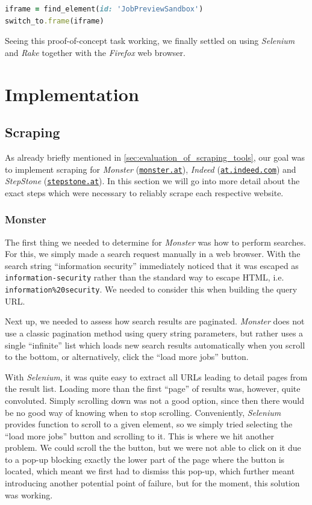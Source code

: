 \documentclass[runningheads]{llncs}
\begin{document}
\begin{lstlisting}[language=Ruby]
iframe = find_element(id: 'JobPreviewSandbox')
switch_to.frame(iframe)
\end{lstlisting}

Seeing this proof-of-concept task working, we finally settled on using \textit{Selenium} and \textit{Rake} together with the \textit{Firefox} web browser.

\section{Implementation}
\label{sec:implementation}

\subsection{Scraping}
\label{sub:scraping}

As already briefly mentioned in \autoref{sec:evaluation_of_scraping_tools}, our goal was to implement scraping for \textit{Monster} (\href{https://www.monster.at/}{\texttt{monster.at}}), \textit{Indeed} (\href{https://at.indeed.com/}{\texttt{at.indeed.com}}) and \textit{StepStone} (\href{https://www.stepstone.at/}{\texttt{stepstone.at}}). In this section we will go into more detail about the exact steps which were necessary to reliably scrape each respective website.

\subsubsection{Monster}
\label{subsub:monster}

The first thing we needed to determine for \textit{Monster} \cite{monster} was how to perform searches. For this, we simply made a search request manually in a web browser. With the search string “information security” immediately noticed that it was escaped as \texttt{information-security} rather than the standard way to escape HTML, i.e. \texttt{information\%20security}. We needed to consider this when building the query URL.

Next up, we needed to assess how search results are paginated. \textit{Monster} does not use a classic pagination method using query string parameters, but rather uses a single “infinite” list which loads new search results automatically when you scroll to the bottom, or alternatively, click the “load more jobs” button.

With \textit{Selenium}, it was quite easy to extract all URLs leading to detail pages from the result list. Loading more than the first “page” of results was, however, quite convoluted. Simply scrolling down was not a good option, since then there would be no good way of knowing when to stop scrolling. Conveniently, \textit{Selenium} provides function to scroll to a given element, so we simply tried selecting the “load more jobs” button and scrolling to it. This is where we hit another problem. We could scroll the the button, but we were not able to click on it due to a pop-up blocking exactly the lower part of the page where the button is located, which meant we first had to dismiss this pop-up, which further meant introducing another potential point of failure, but for the moment, this solution was working.
\end{document}

